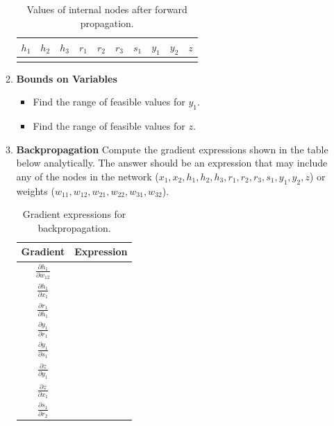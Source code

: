 \documentclass[a3paper,12pt]{extarticle} %
\begin{document}
\begin{enumerate}
\begin{enumerate}
\begin{table}[h!]
\centering
\begin{tabular}{|c|c|c|c|c|c|c|c|c|c|}
\hline
$h_1$ & $h_2$ & $h_3$ & $r_1$ & $r_2$ & $r_3$ & $s_1$ & $y_1$ & $y_2$ & $z$ \\ \hline
 & & & & & & & & & \\ \hline
\end{tabular}
\caption{Values of internal nodes after forward propagation.}
\label{table:forward}
\end{table}

\item \textbf{Bounds on Variables}
\begin{itemize}
    \item Find the range of feasible values for $y_1$.
    \item Find the range of feasible values for $z$.
\end{itemize}

\item \textbf{Backpropagation}
Compute the gradient expressions shown in the table below analytically. The answer should be an expression that may include any of the nodes in the network ($x_1, x_2, h_1, h_2, h_3, r_1, r_2, r_3, s_1, y_1, y_2, z$) or weights ($w_{11}, w_{12}, w_{21}, w_{22}, w_{31}, w_{32}$).

\begin{table}[h!]
\centering
\begin{tabular}{|c|c|}
\hline
\textbf{Gradient} & \textbf{Expression} \\ \hline
$\frac{\partial h_1}{\partial w_{12}}$ & \\ \hline
$\frac{\partial h_1}{\partial x_1}$ & \\ \hline
$\frac{\partial r_1}{\partial h_1}$ & \\ \hline
$\frac{\partial y_1}{\partial r_1}$ & \\ \hline
$\frac{\partial y_1}{\partial s_1}$ & \\ \hline
$\frac{\partial z}{\partial y_1}$ & \\ \hline
$\frac{\partial z}{\partial x_1}$ & \\ \hline
$\frac{\partial s_1}{\partial r_2}$ & \\ \hline
\end{tabular}
\caption{Gradient expressions for backpropagation.}
\label{table:gradients}
\end{table}

\end{enumerate}

\end{enumerate}
\newpage
\end{document}

